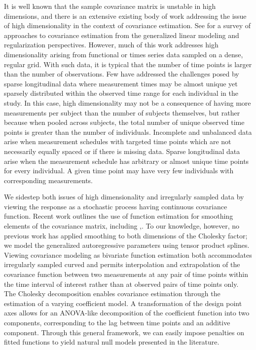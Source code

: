 \documentclass[12pt]{article}
\theoremstyle{definition}
\begin{document}
It is well known that the sample covariance matrix is unstable in high dimensions, and there is an extensive existing body of work addressing the issue of high dimensionality in the context of covariance estimation. See \citet{pourahmadi2011covariance} for a survey of approaches to covariance estimation from the generalized linear modeling and regularization perspectives. However, much of this work addresses high dimensionality arising from functional or times series data sampled on a dense, regular grid. With such data, it is typical that the number of time points is larger than the number of observations. Few have addressed the challenges posed by sparse longitudinal data where measurement times may be almost unique yet sparsely distributed within the observed time range for each individual in the study. In this case, high dimensionality may not be a consequence of having more measurements per subject than the number of subjects themselves, but rather because when pooled across subjects, the total number of unique observed time points is greater than the number of individuals. Incomplete and unbalanced data arise when measurement schedules with targeted time points which are not necessarily equally spaced or if there is missing data. Sparse longitudinal data arise when the measurement schedule has arbitrary or almost unique time points for every individual. A given time point may have very few individuals with corresponding measurements. 

We sidestep both issues of high dimensionality and irregularly sampled data by viewing the response as a stochastic process having continuous covariance function. Recent work outlines the use of function estimation for smoothing elements of the covariance matrix, including \citet{wu2003nonparametric},\citet{huang2007estimation}. To our knowledge, however, no previous work has applied  smoothing to both dimensions of the Cholesky factor;  we model the generalized autoregressive parameters using tensor product splines. Viewing covariance modeling as bivariate function estimation both accommodates irregularly sampled curved and permits interpolation and extrapolation of the covariance function between two measurements at any pair of time points within the time interval of interest rather than at observed pairs of time points only. The Cholesky decomposition enables covariance estimation through the estimation of a varying coefficient model. A transformation of the design point axes allows for an ANOVA-like decomposition of the coefficient function into two components, corresponding to the lag between time points and an additive component. Through this general framework, we can easily impose penalties on fitted functions to yield natural null models presented in the literature. 
\end{document}
